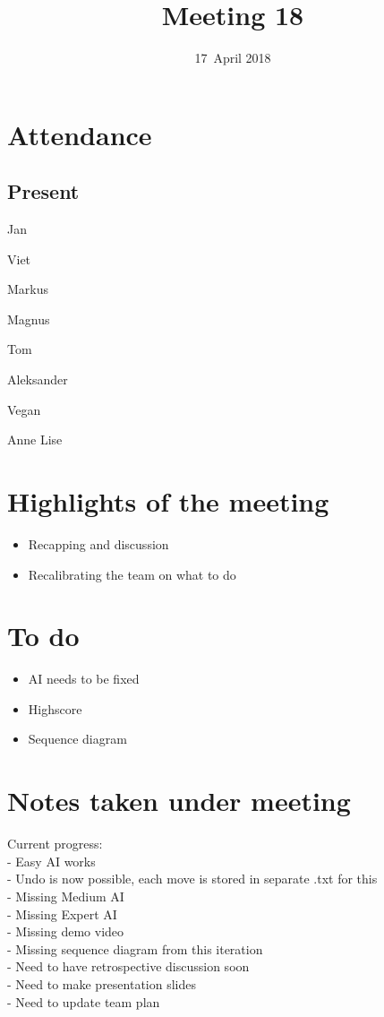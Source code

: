 \documentclass[letterpaper,11pt]{article}
\title{Meeting 18}
\date{17~April 2018}
\begin{document}
\maketitle
\section*{Attendance}
\subsection*{Present}
\begin{list}{}{}
	\item Jan
	\item Viet
	\item Markus
	\item Magnus
	\item Tom
	\item Aleksander
	\item Vegan
	\item Anne Lise
\end{list}

\newpage
\section*{Highlights of the meeting}
\begin{itemize}
	\item Recapping and discussion
	\item Recalibrating the team on what to do
\end{itemize}

\section*{To do}
\begin{itemize}
	\item AI needs to be fixed
	\item Highscore
	\item Sequence diagram
\end{itemize}

\section*{Notes taken under meeting}
Current progress:\\
- Easy AI works\\
- Undo is now possible, each move is stored in separate .txt for this\\
- Missing Medium AI\\
- Missing Expert AI\\
- Missing demo video\\
- Missing sequence diagram from this iteration\\
- Need to have retrospective discussion soon\\
- Need to make presentation slides\\
- Need to update team plan\\
\end{document}
